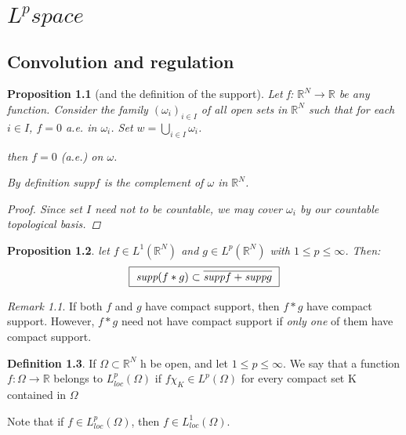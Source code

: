\documentclass[a4paper]{book}
\begin{document}
  \newtheorem{thm}{Theorem}[chapter]
  \newtheorem{lemma}[thm]{Lemma}
  \newtheorem{cor}[thm]{Corllary}
  \newtheorem{prop}[thm]{Proposition}
  \theoremstyle{definition}
  \newtheorem{defi}[thm]{Definition}
  \theoremstyle{remark}
  \newtheorem{rmk}{Remark}
  \setcounter{chapter}{3}
\chapter{$L^p space$}
 \section{Convolution and regulation}
    \begin{prop}[and the definition of the support]
        Let f: $\mathbb{R}^N \rightarrow \mathbb{R}$ be any function. Consider the family $(\omega_i)_{i\in I}$ of all open sets in $\mathbb{R}^N$ such that for each $i \in I$, $f = 0$ \emph{a.e.} in $\omega_i$. Set $w= \bigcup_ {i \in I} \omega _ i$.

        then $f = 0$ \emph(a.e.) on $\omega$.

        By definition \emph{supp}$f$ is the complement of $\omega$ in $\mathbb{R}^N$.
    \begin{proof}
        Since set $I$ need not to be \emph{countable}, we may cover $\omega_i$ by our \emph{countable} topological basis.
    \end{proof}
    \end{prop}

    \begin{prop}
        let $f\in L^1(\mathbb{R}^N)$ and $g\in L^p(\mathbb{R}^N)$ with $1 \le p \le \infty $. Then: \[ \fbox{ $ \emph{supp}(f*g) \subset \overline {\emph{supp}f + \emph{supp}g} \ $} \]
    \end {prop}

    \begin{rmk}
        If both $f$ and $g$ have compact support, then $f*g$ have compact support. However, $f*g$ need not have compact support if \emph{only one} of them have compact support.
    \end{rmk}

    \begin{defi}
        If $\Omega \subset \mathbb{R}^N$ h be open, and let $1 \le p \le \infty $. We say that a function $f:\Omega \rightarrow \mathbb{R}$ belongs to $L_{loc}^p(\Omega)$ if $f\chi_K \in L^p(\Omega)$ for every compact set K contained in $\Omega$

        Note that if $f \in L_{loc}^p(\Omega)$, then $f \in L_{loc}^1(\Omega)$.
    \end{defi}
\end{document}
